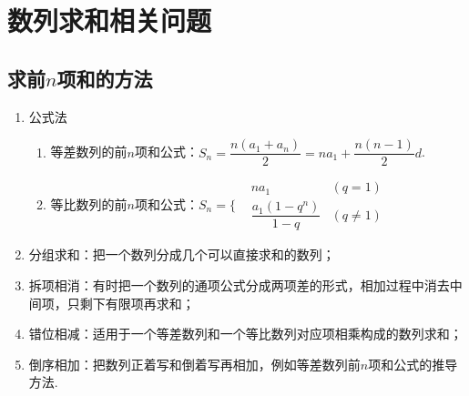 \documentclass{BHCexam}
\begin{document}
\section{数列求和相关问题}
\subsection{求前$ n $项和的方法}
\begin{enumerate}
\item 公式法\begin{enumerate}
\item 等差数列的前$ n $项和公式：$S_n=\dfrac{n(a_1+a_n)}{2}=na_1+\dfrac{n(n-1)}{2}d$.
\item 等比数列的前$ n $项和公式：$S_n=\Bigg\{\begin{aligned}
&na_1&\left(q=1\right)\\
&\dfrac{a_1\left(1-q^n\right)}{1-q}&\left(q\ne1\right)
\end{aligned}$
\end{enumerate}
\item 分组求和：把一个数列分成几个可以直接求和的数列；
\item 拆项相消：有时把一个数列的通项公式分成两项差的形式，相加过程中消去中间项，只剩下有限项再求和；
\item 错位相减：适用于一个等差数列和一个等比数列对应项相乘构成的数列求和；
\item 倒序相加：把数列正着写和倒着写再相加，例如等差数列前$ n $项和公式的推导方法.
\end{enumerate}
\end{document}
